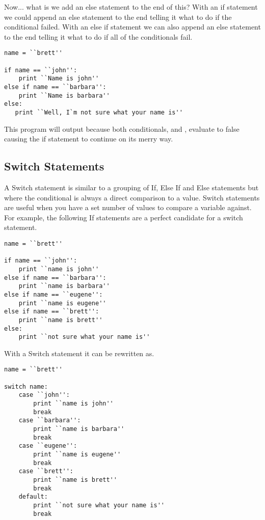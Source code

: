 Now... what is we add an else statement to the end of this?
With an if statement we could append an else statement to the end telling it what to do if the conditional failed.
With an else if statement we can also append an else statement to the end telling it what to do if all of the conditionals fail.

\begin{lstlisting}[caption={Else If Else Statement}]
name = ``brett''

if name == ``john'':
    print ``Name is john''
else if name == ``barbara'':
    print ``Name is barbara''
else:
   print ``Well, I`m not sure what your name is''
\end{lstlisting}

This program will output  because both conditionals,  and , evaluate to false causing the if statement to continue on its merry way.

\subsection{Switch Statements}
A Switch statement is similar to a grouping of If, Else If and Else statements but where the conditional is always a direct comparison to a value.
Switch statements are useful when you have a set number of values to compare a variable against.
For example, the following If statements are a perfect candidate for a switch statement.

\begin{lstlisting}[caption={Switch Statement Candidate}]
name = ``brett''

if name == ``john'':
    print ``name is john''
else if name == ``barbara'':
    print ``name is barbara''
else if name == ``eugene'':
    print ``name is eugene''
else if name == ``brett'':
    print ``name is brett''
else:
    print ``not sure what your name is''
\end{lstlisting}

With a Switch statement it can be rewritten as.

\begin{lstlisting}[caption={Switch Statement Example}]
name = ``brett''

switch name:
    case ``john'':
        print ``name is john''
        break
    case ``barbara'':
        print ``name is barbara''
        break
    case ``eugene'':
        print ``name is eugene''
        break
    case ``brett'':
        print ``name is brett''
        break
    default:
        print ``not sure what your name is''
        break
\end{lstlisting}

